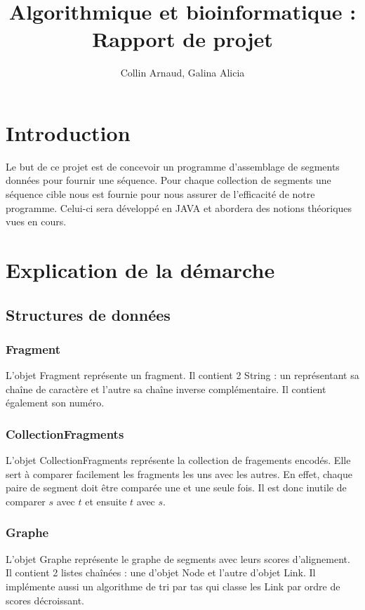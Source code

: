 \documentclass{article}
\begin{document}
\title{Algorithmique et bioinformatique : Rapport de projet}
\author{Collin Arnaud, Galina Alicia}
\maketitle
\newpage
\tableofcontents
\newpage
\section{Introduction}
Le but de ce projet est de concevoir un programme d'assemblage de segments données pour fournir une séquence. Pour chaque collection de segments une séquence cible nous est fournie pour nous assurer de l'efficacité de notre programme. Celui-ci sera développé en JAVA et abordera des notions théoriques vues en cours.

\section{Explication de la démarche}

\subsection{Structures de données}
\subsubsection{Fragment}
L'objet Fragment représente un fragment. Il contient 2 String : un représentant sa chaîne de caractère et l'autre sa chaîne inverse complémentaire. Il contient également son numéro.

\subsubsection{CollectionFragments}
L'objet CollectionFragments représente la collection de fragements encodés. Elle sert à comparer facilement les fragments les uns avec les autres. En effet, chaque paire de segment doit être comparée une et une seule fois. Il est donc inutile de comparer $s$ avec $t$ et ensuite $t$ avec $s$.   

\subsubsection{Graphe}
L'objet Graphe représente le graphe de segments avec leurs scores d'alignement. Il contient 2 listes chaînées : une d'objet Node et l'autre d'objet Link. Il implémente aussi un algorithme de tri par tas qui classe les Link par ordre de scores décroissant.
\end{document}
